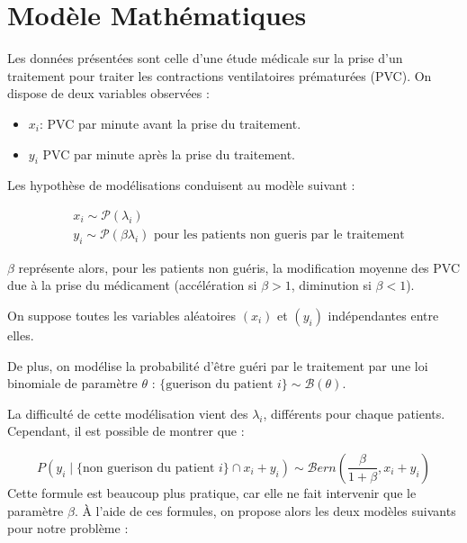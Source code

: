 \section{Modèle Mathématiques}

Les données présentées sont celle d'une étude médicale sur la prise d'un traitement pour traiter les contractions ventilatoires prématurées (PVC).
On dispose de deux variables observées : 
\begin{itemize}
    \item $x_i$: PVC par minute avant la prise du traitement.
    \item $y_i$ PVC par minute après la prise du traitement.
\end{itemize}

Les hypothèse de modélisations conduisent au modèle suivant : 

\begin{equation} \label{eq1}
\begin{split}
    & x_i \sim \mathcal P (\lambda_i) \\
    & y_i \sim \mathcal P (\beta \lambda_i) \text{ pour les patients non gueris par le traitement}
\end{split}
\end{equation}

$\beta$ représente alors, pour les patients non guéris, la modification moyenne des PVC due à la prise du médicament (accélération si $\beta > 1$, diminution si $\beta < 1$).

On suppose toutes les variables aléatoires $(x_i)$ et $(y_i)$ indépendantes entre elles.

De plus, on modélise la probabilité d'être guéri par le traitement par une loi binomiale de paramètre $\theta$ : $\{\text{guerison du patient } i \} \sim \mathcal B(\theta)$.

La difficulté de cette modélisation vient des $\lambda_i$, différents pour chaque patients. Cependant, il est possible de montrer que :

\begin{equation}
    P(y_i \mid\{\text{non guerison du patient }i\} \cap x_i+y_i) \sim \mathcal{B}ern \left (\dfrac{\beta}{1 + \beta}, x_i+y_i \right) 
\end{equation}
Cette formule est beaucoup plus pratique, car elle ne fait intervenir que le paramètre $\beta$. À l'aide de ces formules, on propose alors les deux modèles suivants pour notre problème :

